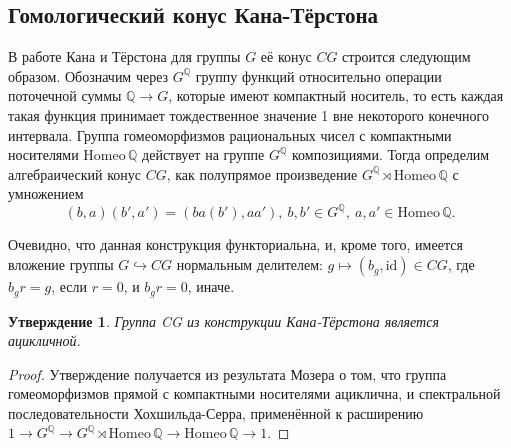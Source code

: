 \documentclass[14pt, dvipsnames, twoside]{extarticle}
\newtheorem{statement}{Утверждение}
\theoremstyle{definition}
\theoremstyle{remark}
\newtheorem*{comment}{Замечание}
\begin{document}
\subsection{Гомологический конус Кана-Тёрстона} 





В работе \cite{Kan} Кана и Тёрстона для группы $G$ её конус $CG$ строится следующим образом. Обозначим через $G^{\mathbb{Q}}$ группу функций относительно операции поточечной суммы $\mathbb{Q}\to G$, которые имеют компактный носитель, то есть каждая такая функция принимает тождественное значение 1 вне некоторого конечного интервала. Группа гомеоморфизмов рациональных чисел с компактными носителями $\mathrm{Homeo}\, \mathbb{Q}$ действует на группе $G^{\mathbb{Q}}$ композициями. Тогда определим алгебраический конус $CG$, как полупрямое произведение $G^{\mathbb{Q}}\rtimes \mathrm{Homeo}\, \mathbb{Q}$ с умножением $$(b, a)(b', a')=(ba(b'), aa'),\ b, b'\in G^{\mathbb{Q}},\ a, a'\in \mathrm{Homeo}\, \mathbb{Q}.$$

Очевидно, что данная конструкция функториальна, и, кроме того, имеется вложение группы $G\hookrightarrow CG$ нормальным делителем: $g\mapsto (b_g, \mathrm{id})\in CG$, где $b_gr=g$, если $r=0$, и $b_gr=0$, иначе.

\begin{statement}
Группа CG из конструкции Кана-Тёрстона является ацикличной.
\end{statement}

\begin{proof}
Утверждение получается из результата Мозера \cite{Mather} о том, что группа гомеоморфизмов прямой с компактными носителями ациклична, и спектральной последовательности Хохшильда-Серра, применённой к расширению $1\to G^{\mathbb{Q}}\to G^{\mathbb{Q}}\rtimes \mathrm{Homeo}\, \mathbb{Q}\to \mathrm{Homeo}\, \mathbb{Q}\to 1.$
\end{proof}

\end{document}
